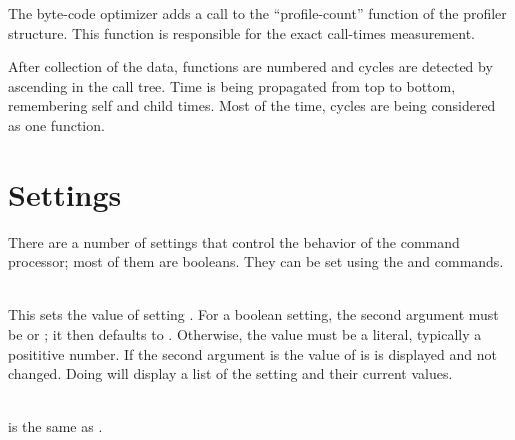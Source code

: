 The byte-code optimizer  adds a call to the ``profile-count'' function of the
profiler structure. This function is responsible for the exact call-times measurement.

After collection of the data, functions are numbered and cycles are detected by ascending in the
call tree. Time is being propagated from top to bottom, remembering self and child times. Most
of the time, cycles are being considered as one function.


\section{Settings}
\label{settings}

There are a number of settings that control the behavior of the
 command processor; most of them are booleans.
They can be set using the  and  commands.

\begin{description}
\item {}\\
    This sets the value of setting .
    For a boolean setting, the second argument must be  or
    ; it then defaults to .
    Otherwise, the value must be a literal, typically a posititive number.
    If the second argument is  the value of  is
    is displayed and not changed.
    Doing  will display a list of the setting and
    their current values.

\item {}\\
     is the same as
    .
\end{description}

